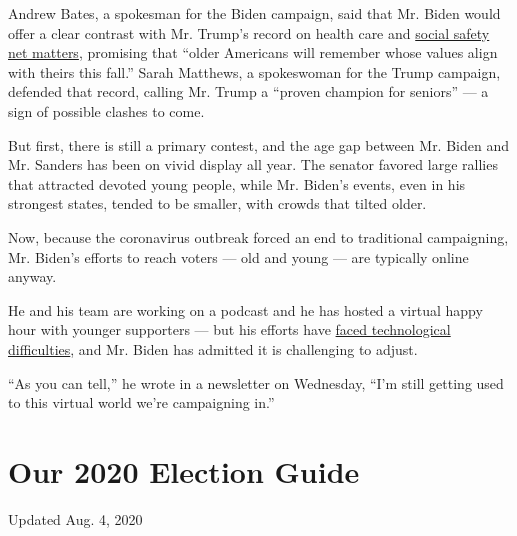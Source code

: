 Andrew Bates, a spokesman for the Biden campaign, said that Mr. Biden
would offer a clear contrast with Mr. Trump's record on health care and
\href{https://www.nytimes3xbfgragh.onion/2020/01/22/us/politics/medicare-trump.html}{social
safety net matters}, promising that ``older Americans will remember
whose values align with theirs this fall.'' Sarah Matthews, a
spokeswoman for the Trump campaign, defended that record, calling Mr.
Trump a ``proven champion for seniors'' --- a sign of possible clashes
to come.

But first, there is still a primary contest, and the age gap between Mr.
Biden and Mr. Sanders has been on vivid display all year. The senator
favored large rallies that attracted devoted young people, while Mr.
Biden's events, even in his strongest states, tended to be smaller, with
crowds that tilted older.

Now, because the coronavirus outbreak forced an end to traditional
campaigning, Mr. Biden's efforts to reach voters --- old and young ---
are typically online anyway.

He and his team are working on a podcast and he has hosted a virtual
happy hour with younger supporters --- but his efforts have
\href{https://www.nytimes3xbfgragh.onion/2020/03/13/us/politics/joe-biden-digital-campaign.html}{faced
technological difficulties}, and Mr. Biden has admitted it is
challenging to adjust.

``As you can tell,'' he wrote in a newsletter on Wednesday, ``I'm still
getting used to this virtual world we're campaigning in.''

\hypertarget{our-2020-election-guide}{%
\section{Our 2020 Election Guide}\label{our-2020-election-guide}}

Updated Aug. 4, 2020

